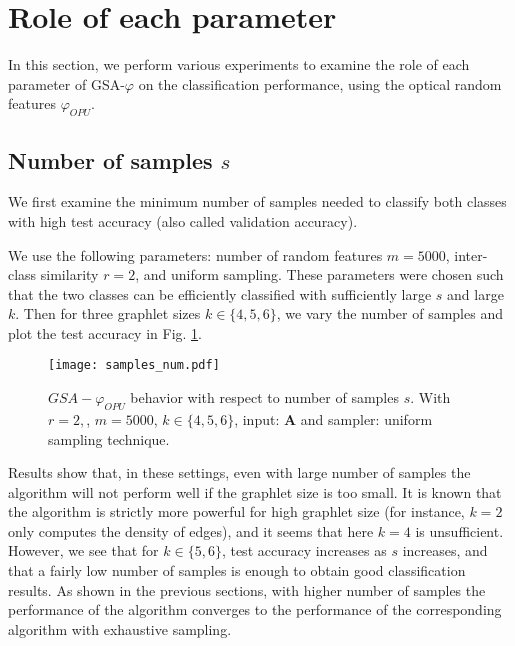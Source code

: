 \section{Role of each parameter}

In this section, we perform various experiments to examine the role of each parameter of GSA-$\varphi$ on the classification performance, using the optical random features $\varphi_{OPU}$.

\subsection{Number of samples $s$}
We first examine the minimum number of samples needed to classify both classes with high test accuracy (also called validation accuracy).

We use the following parameters: number of random features $m=5000$, inter-class similarity $r=2$, and uniform sampling. These parameters were chosen such that the two classes can be efficiently classified with sufficiently large $s$ and large $k$. Then for three graphlet sizes $k\in\{4,5,6\}$, we vary the number of samples and plot the test accuracy in Fig. \ref{fig:varying_samples_num}.

\begin{figure}[H]
\centering
\texttt{[image: samples\_num.pdf]}
\caption[$GSA-\varphi_{OPU}$ behavior with respect to number of samples $s$]{$GSA-\varphi_{OPU}$ behavior with respect to number of samples $s$. With $r=2,$, $m=5000$, $k\in\{4,5,6\}$, input: $\mathbf{A}$ and sampler: uniform sampling technique.}
\label{fig:varying_samples_num}
\end{figure}
Results show that, in these settings, even with large number of samples the algorithm will not perform well if the graphlet size is too small. It is known that the algorithm is strictly more powerful for high graphlet size (for instance, $k=2$ only computes the density of edges), and it seems that here $k=4$ is unsufficient. %
However, we see that for $k\in\{5,6\}$, test accuracy increases as $s$ increases, and that a fairly low number of samples is enough to obtain good classification results. As shown in the previous sections, with higher number of samples the performance of the algorithm converges to the performance of the corresponding algorithm with exhaustive sampling.

